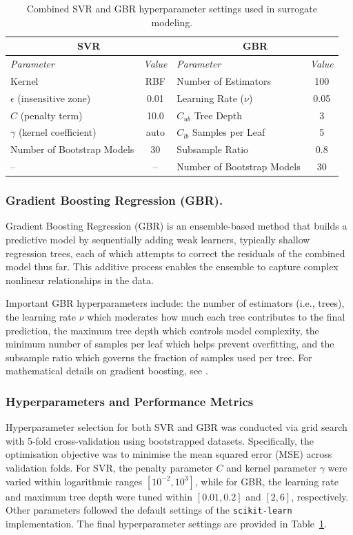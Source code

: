 \documentclass[authoryear,preprint,review,12pt]{elsarticle}
\begin{document}
\begin{table}[htbp]
\centering
\caption{Combined SVR and GBR hyperparameter settings used in surrogate modeling.}
\label{tab:surrogate_hyperparams}
\begin{tabular}{|l|c|l|c|}
\hline
\multicolumn{2}{|c|}{\textbf{SVR}} & \multicolumn{2}{c|}{\textbf{GBR}} \\
\hline
\textit{Parameter} & \textit{Value} & \textit{Parameter} & \textit{Value} \\
\hline
Kernel & RBF & Number of Estimators & 100 \\
$\epsilon$ (insensitive zone) & 0.01 & Learning Rate ($\nu$) & 0.05 \\
$C$ (penalty term) & 10.0 & $C_{ub}$ Tree Depth & 3 \\
$\gamma$ (kernel coefficient) & auto & $C_{lb}$ Samples per Leaf & 5 \\
Number of Bootstrap Models & 30 & Subsample Ratio & 0.8 \\
-- & -- & Number of Bootstrap Models & 30 \\
\hline
\end{tabular}
\end{table}

\subsubsection{Gradient Boosting Regression (GBR).}
Gradient Boosting Regression (GBR) is an ensemble-based method that builds a predictive model by sequentially adding weak learners, typically shallow regression trees, each of which attempts to correct the residuals of the combined model thus far. This additive process enables the ensemble to capture complex nonlinear relationships in the data.

Important GBR hyperparameters include: the number of estimators (i.e., trees), the learning rate $\nu$ which moderates how much each tree contributes to the final prediction, the maximum tree depth which controls model complexity, the minimum number of samples per leaf which helps prevent overfitting, and the subsample ratio which governs the fraction of samples used per tree. For mathematical details on gradient boosting, see \citep{Friedman2001GBR}.

\subsubsection{Hyperparameters and Performance Metrics}
Hyperparameter selection for both SVR and GBR was conducted via grid search with 5-fold cross-validation using bootstrapped datasets. Specifically, the optimisation objective was to minimise the mean squared error (MSE) across validation folds. For SVR, the penalty parameter $C$ and kernel parameter $\gamma$ were varied within logarithmic ranges $[10^{-2}, 10^{3}]$, while for GBR, the learning rate and maximum tree depth were tuned within $[0.01, 0.2]$ and $[2, 6]$, respectively. Other parameters followed the default settings of the \texttt{scikit-learn} implementation. The final hyperparameter settings are provided in Table~\ref{tab:surrogate_hyperparams}. 
\end{document}
